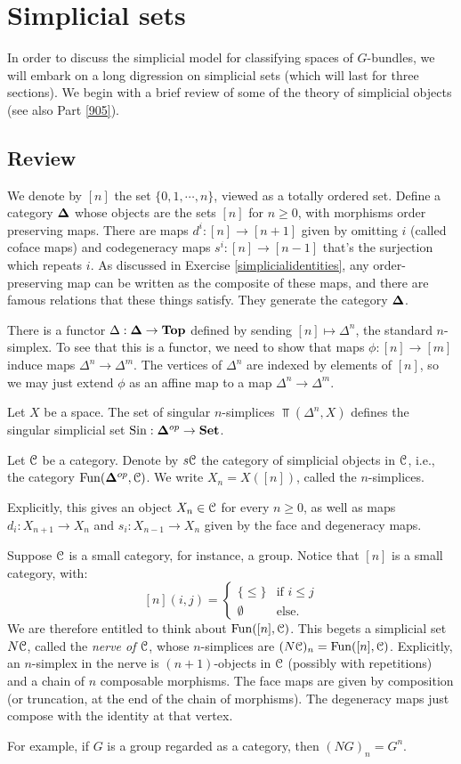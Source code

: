 \section{Simplicial sets}
In order to discuss the simplicial model for classifying spaces of $G$-bundles,
we will embark on a long digression on simplicial sets (which will last for
three sections). We begin with a brief review of some of the theory of
simplicial objects (see also Part \ref{905}).
\subsection{Review}
We denote by $[n]$ the set $\{0,1,\cdots,n\}$, viewed as a totally ordered set.
Define a category ${\mathbf{\Delta}}$ whose objects are the sets $[n]$ for $n\geq 0$,
with morphisms order preserving maps. There are maps $d^i:[n]\to [n+1]$ given
by omitting $i$ (called coface maps) and codegeneracy maps $s^i:[n]\to[n-1]$
that's the surjection which repeats $i$. As discussed in Exercise
\ref{simplicialidentities}, any order-preserving map can be written as the
composite of these maps, and there are famous relations that these things
satisfy. They generate the category ${\mathbf{\Delta}}$.

There is a functor $\Delta:{\mathbf{\Delta}}\to\mathbf{Top}$ defined by sending
$[n]\mapsto\Delta^n$, the standard $n$-simplex. To see that this is a functor,
we need to show that maps $\phi:[n]\to [m]$ induce maps $\Delta^n\to \Delta^m$.
The vertices of $\Delta^n$ are indexed by elements of $[n]$, so we may just
extend $\phi$ as an affine map to a map $\Delta^n\to\Delta^m$.

Let $X$ be a space. The set of singular $n$-simplices $\Top(\Delta^n,X)$
defines the singular simplicial set $\mathrm{Sin}:{\mathbf{\Delta}}^{op}\to\mathbf{Set}$.
\begin{definition}
    Let $\mathcal C$ be a category. Denote by $s\mathcal C$ the category of simplicial
    objects in $\mathcal C$, i.e., the category $\operatorname{Fun}({\mathbf{\Delta}}^{op},\mathcal C)$. We write
    $X_n = X([n])$, called the $n$-simplices.
\end{definition}
Explicitly, this gives an object $X_n\in\mathcal C$ for every $n\geq 0$, as well as
maps $d_i:X_{n+1}\to X_n$ and $s_i:X_{n-1}\to X_n$ given by the face and
degeneracy maps.
\begin{example}
    Suppose $\mathcal C$ is a small category, for instance, a group. Notice that $[n]$
    is a small category, with:
    $$[n](i,j) = \begin{cases}
	\{\leq\} & \text{if }i\leq j\\
	\emptyset & \text{else}.
    \end{cases}$$
    We are therefore entitled to think about $\operatorname{Fun}([n],\mathcal C)$. This begets a
    simplicial set $N\mathcal C$, called the \emph{nerve of $\mathcal C$}, whose
    $n$-simplices are $(N\mathcal C)_n = \operatorname{Fun}([n],\mathcal C)$. Explicitly, an $n$-simplex in
    the nerve is $(n+1)$-objects in $\mathcal C$ (possibly with repetitions) and a
    chain of $n$ composable morphisms. The face maps are given by composition
    (or truncation, at the end of the chain of morphisms). The degeneracy maps
    just compose with the identity at that vertex.
    
    For example, if $G$ is a group regarded as a category, then $(NG)_n = G^n$.
\end{example}
